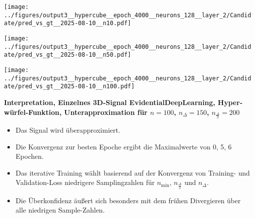 \begin{otherlanguage}{ngerman}
\begin{samepage}
\begin{minipage}{\textwidth}
\begin{minipage}{0.05\textwidth}
    \centering{}
\end{minipage}%
\begin{minipage}{0.3\textwidth}
    \centering
    \texttt{[image: ../figures/output3\_\_hypercube\_\_epoch\_4000\_\_neurons\_128\_\_layer\_2/Candidate/pred\_vs\_gt\_\_2025-08-10\_\_n10.pdf]}
\end{minipage}%
\begin{minipage}{0.3\textwidth}
    \centering
    \texttt{[image: ../figures/output3\_\_hypercube\_\_epoch\_4000\_\_neurons\_128\_\_layer\_2/Candidate/pred\_vs\_gt\_\_2025-08-10\_\_n50.pdf]}
\end{minipage}%
\begin{minipage}{0.3\textwidth}
    \centering
    \texttt{[image: ../figures/output3\_\_hypercube\_\_epoch\_4000\_\_neurons\_128\_\_layer\_2/Candidate/pred\_vs\_gt\_\_2025-08-10\_\_n100.pdf]}
\end{minipage}

\label{fig:pred_vs_gt_matrix}

\end{minipage}
\end{samepage}


\clearpage

\begin{samepage}
\begin{minipage}{\textwidth}

\noindent\textbf{Interpretation, Einzelnes 3D-Signal \gls{EvidentialDeepLearning}, Hyperwürfel-Funktion,
Unterapproximation für $n=100$, $n_{\Delta}=150$, $n_{\frac{\Delta}{2}}=200$}

\begin{itemize}
    \item Das Signal wird überapproximiert.
    \item Die Konvergenz zur besten Epoche ergibt die Maximalwerte von 0, 5, 6 Epochen.
    \item Das iterative Training wählt basierend auf der Konvergenz von Training- und Validation-Loss niedrigere Samplingzahlen für $n_{\min}$, $n_{\frac{\Delta}{2}}$ und $n_{\Delta}$.
    \item Die Überkonfidenz äußert sich besonders mit dem frühen Divergieren über alle niedrigen Sample-Zahlen.
\end{itemize}





\end{minipage}
\end{samepage}
\end{otherlanguage}
